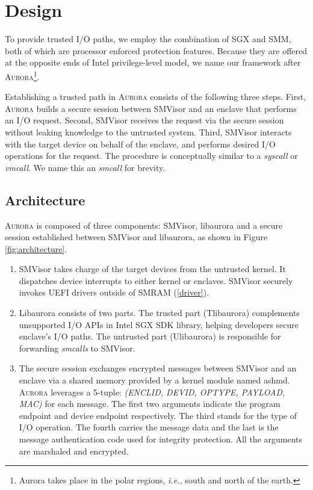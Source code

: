 \section{Design}
To provide trusted I/O paths, we employ the combination of SGX and SMM, both of which are processor enforced protection features. Because they are offered at the opposite ends of Intel privilege-level model, we name our framework after \textsc{Aurora}\footnote{Aurora takes place in the polar regions, \emph{i.e.,} south and north of the earth.}.

Establishing a trusted path in \textsc{Aurora} consists of the following three steps. First, \textsc{Aurora} builds a secure session between SMVisor and an enclave that performs an I/O request. Second, SMVisor receives the request via the secure session without leaking knowledge to the untrusted system. Third, SMVisor interacts with the target device on behalf of the enclave, and performs desired I/O operations for the request. The procedure is conceptually similar to a \textit{syscall} or \textit{vmcall}. We name this an \textit{smcall} for brevity.

\subsection{Architecture}\label{arch}

\textsc{Aurora} is composed of three components: SMVisor, libaurora and a secure session established between SMVisor and libaurora, as shown in Figure \ref{fig:architecture}.

\begin{enumerate}%
\item SMVisor takes charge of the target devices from the untrusted kernel. It dispatches device interrupts to either kernel or enclaves. SMVisor securely invokes UEFI drivers outside of SMRAM (\autoref{driver}).
\item Libaurora consists of two parts. The trusted part (Tlibaurora) complements unsupported I/O APIs in Intel SGX SDK library, helping developers secure enclave's I/O paths. The untrusted part (Ulibaurora) is responsible for forwarding \textit{smcalls} to SMVisor.  %
\item The secure session exchanges encrypted messages between SMVisor and an enclave via a shared memory provided by a kernel module named ashmd.  \textsc{Aurora} leverages a 5-tuple: \textit{(ENCLID, DEVID, OPTYPE, PAYLOAD, MAC)} for each message. The first two arguments indicate the program endpoint and device endpoint respectively.  The third stands for the type of I/O operation. The fourth carries the message data and the last is the message authentication code used for integrity protection. All the arguments are marshaled and encrypted. 

\end{enumerate}

